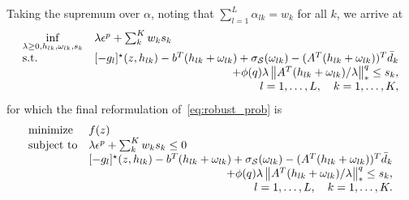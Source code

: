 Taking the supremum over $\alpha$, noting that $\sum_{l=1}^L \alpha_{lk} = w_k$ for all $k$, we arrive at
\begin{equation*}
\begin{aligned}
\begin{array}[t]{ll}
\underset{\lambda \geq 0, h_{lk},\omega_{lk}, s_k}{\inf} & \lambda \epsilon^p + \sum_k^K w_k s_k\\
\mbox{s.t.} & [-g_l]^\star(z,h_{lk}) -b^T(h_{lk} + \omega_{lk}) + \sigma_\supp(\omega_{lk}) - (A^T(h_{lk} + \omega_{lk}))^T \bar{d}_k \\
& \hfill + \phi(q)\lambda \left\|A^T(h_{lk} + \omega_{lk})/\lambda \right\|^q_* \le s_k,\\
& \hfill l = 1,\dots,L, \quad k = 1,\dots,K,
\end{array}
\end{aligned}
\end{equation*}
for which the final reformulation of~\eqref{eq:robust_prob} is
\begin{equation*}
	\begin{aligned}
	\begin{array}[t]{ll}
	{\text{minimize}} & f(z)\\
	\mbox{subject to} &\lambda \epsilon^p + \sum_k^K w_k s_k \leq 0\\
	 & [-g_l]^\star(z,h_{lk}) -b^T(h_{lk} + \omega_{lk}) + \sigma_\supp(\omega_{lk}) - (A^T(h_{lk} + \omega_{lk}))^T \bar{d}_k \\
& \hfill + \phi(q)\lambda \left\|A^T(h_{lk} + \omega_{lk})/\lambda \right\|^q_* \le s_k,\\
& \hfill l = 1,\dots,L, \quad k = 1,\dots,K.
	\end{array}
	\end{aligned}
	\end{equation*}



